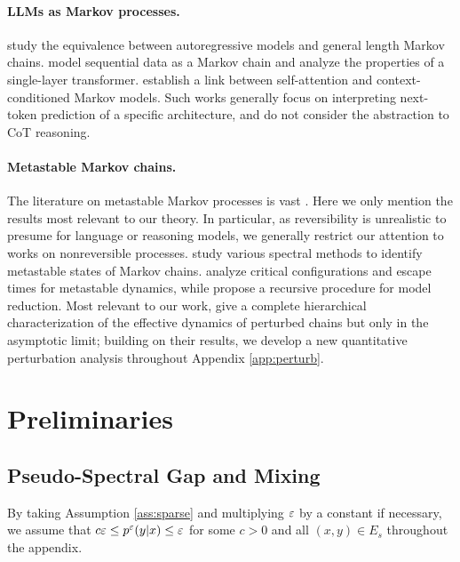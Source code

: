 \paragraph{LLMs as Markov processes.} \citet{Zekri24} study the equivalence between autoregressive models and general length Markov chains. \citet{Makkuva24,Edelman24} model sequential data as a Markov chain and analyze the properties of a single-layer transformer. \citet{Ildiz24} establish a link between self-attention and context-conditioned Markov models. Such works generally focus on interpreting next-token prediction of a specific architecture, and do not consider the abstraction to CoT reasoning.

\paragraph{Metastable Markov chains.}
The literature on metastable Markov processes is vast \citep[e.g.,][]{Madras01,Bovier02,Beltran11,Landim18}. Here we only mention the results most relevant to our theory. In particular, as reversibility is unrealistic to presume for language or reasoning models, we generally restrict our attention to works on nonreversible processes. \citet{Fritzsche08,Jacobi10,Tifenbach11,Fackeldey18} study various spectral methods to identify metastable states of Markov chains. \citet{Landim12, Cirillo14,Fernandez14,Fernandez16,Bianchi16} analyze critical configurations and escape times for metastable dynamics, while \citet{Landim15} propose a recursive procedure for model reduction. Most relevant to our work, \citet{Wicks05,Betz16} give a complete hierarchical characterization of the effective dynamics of perturbed chains but only in the asymptotic limit; building on their results, we develop a new quantitative perturbation analysis throughout Appendix \ref{app:perturb}.

\section{Preliminaries}\label{app:prelim}

\subsection{Pseudo-Spectral Gap and Mixing}

By taking Assumption \ref{ass:sparse} and multiplying $\varepsilon$ by a constant if necessary, we assume that $c\varepsilon\le p^\varepsilon(y|x)\le\varepsilon$ for some $c>0$ and all $(x,y)\in E_s$ throughout the appendix.

